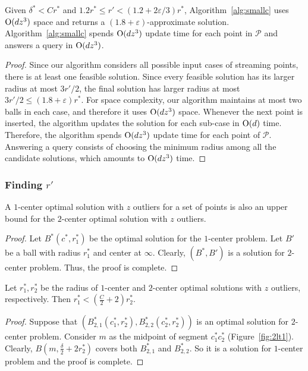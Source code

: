 \documentclass[envcountsame]{cls/cccg15}
\newcommand{\cO}{\ensuremath{{\rm O}}}
\newcommand{\lee}{\leqslant}
\renewcommand{\le}{\lee}
\newcommand{\eps}{\varepsilon}
\begin{document}
\begin{theorem}
Given $\delta^* < C r^*$ and $1.2r^* \le r' < (1.2 + 2\eps/3)r^*$, Algorithm~\ref{alg:smallc} uses $\cO (dz^3)$ space and returns a $(1.8+\eps)$-approximate solution. Algorithm~\ref{alg:smallc} spends $\cO (dz^3)$ update time for each point in $\mathcal{P}$ and answers a query in $\cO (dz^3)$.
\end{theorem}

\begin{proof}
Since our algorithm considers all possible input cases of streaming points, there is at least one feasible solution. Since every feasible solution has its larger radius at most $3r'/2$, the final solution has larger radius at most $3r'/2 \le (1.8 + \eps)r^*$.
For space complexity, our algorithm maintains at most two balls in each case, and therefore it uses $\cO(dz^3)$ space. Whenever the next point is inserted, the algorithm updates the solution for each sub-case in $\cO (d)$ time. Therefore, the algorithm spends $\cO (dz^3)$ update time for each point of $\mathcal{P}$. Answering a query consists of choosing the minimum radius among all the candidate solutions, which amounts to $\cO (dz^3)$ time.
\end{proof}


\subsubsection{Finding $r'$}
\label{subsec:findr}

\begin{lemma}
\label{lem:1lt2}
A $1$-center optimal solution with $z$ outliers for a set of points is also an upper bound for the $2$-center optimal solution with $z$ outliers.
\end{lemma}
\begin{proof}
Let $B^*(c^*, r_1^*)$ be the optimal solution for the $1$-center problem. Let $B'$ be a ball with radius $r_1^*$ and center at $\infty$. Clearly, $(B^*, B')$ is a solution for $2$-center problem. Thus, the proof is complete.
\end{proof}

\begin{lemma}
\label{lem:2lt1}
Let $r_1^*, r_2^*$ be the radius of $1$-center and $2$-center optimal solutions with $z$ outliers, respectively. Then $r_1^* < \left(\frac{C}{2} + 2\right) r_2^*$.
\end{lemma}
\begin{proof}
Suppose that $(B_{2, 1}^*(c_1^*, r_2^*), B_{2,2}^*(c_2^*, r_2^*))$ is an optimal solution for $2$-center problem. Consider $m$ as the midpoint of segment 
$c_1^*c_2^*$ (Figure~\ref{fig:2lt1}).
Clearly, $B\left(m, \frac{\delta}{2} + 2r_2^*\right)$ covers both $B_{2, 1}^*$ and $B_{2,2}^*$. So it is a solution for $1$-center problem and the proof is complete.
\end{proof}
\end{document}
